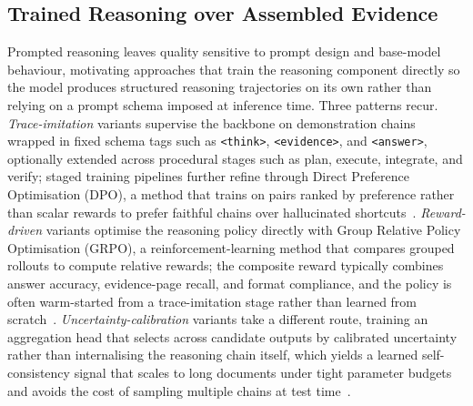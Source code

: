 \documentclass[11pt]{article}
\begin{document}
\subsection{Trained Reasoning over Assembled Evidence}
\label{sec:train-reasoning}

Prompted reasoning leaves quality sensitive to prompt design and base-model behaviour, motivating approaches that train the reasoning component directly so the model produces structured reasoning trajectories on its own rather than relying on a prompt schema imposed at inference time. Three patterns recur. \textit{Trace-imitation} variants supervise the backbone on demonstration chains wrapped in fixed schema tags such as \texttt{<think>}, \texttt{<evidence>}, and \texttt{<answer>}, optionally extended across procedural stages such as plan, execute, integrate, and verify; staged training pipelines further refine through Direct Preference Optimisation (DPO), a method that trains on pairs ranked by preference rather than scalar rewards to prefer faithful chains over hallucinated shortcuts~\cite{guo2026endtoend}. \textit{Reward-driven} variants optimise the reasoning policy directly with Group Relative Policy Optimisation (GRPO), a reinforcement-learning method that compares grouped rollouts to compute relative rewards; the composite reward typically combines answer accuracy, evidence-page recall, and format compliance, and the policy is often warm-started from a trace-imitation stage rather than learned from scratch~\cite{xiong2026docr1}. \textit{Uncertainty-calibration} variants take a different route, training an aggregation head that selects across candidate outputs by calibrated uncertainty rather than internalising the reasoning chain itself, which yields a learned self-consistency signal that scales to long documents under tight parameter budgets and avoids the cost of sampling multiple chains at test time~\cite{hannan2025docslm}.
\end{document}
